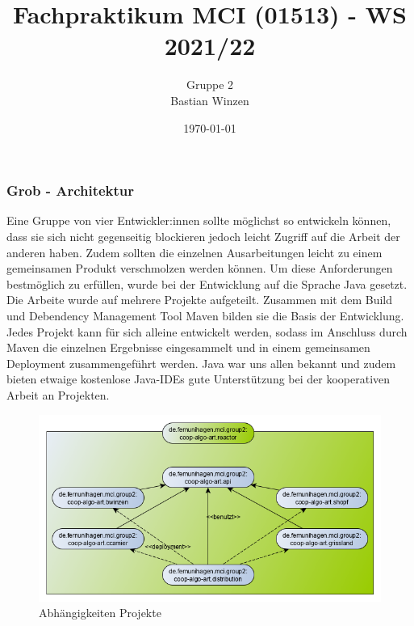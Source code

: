 \documentclass[../mciAusarbeitung.tex]{subfiles}
\title{Fachpraktikum MCI (01513) - WS 2021/22}
\author{Gruppe 2\\
	Bastian Winzen}
\date{\today}
\begin{document}
	\subsubsection{Grob - Architektur}
	Eine Gruppe von vier Entwickler:innen sollte möglichst so entwickeln können, dass sie sich nicht gegenseitig blockieren jedoch leicht Zugriff auf die Arbeit der anderen haben. Zudem sollten die einzelnen Ausarbeitungen leicht zu einem gemeinsamen Produkt verschmolzen werden können. Um diese Anforderungen bestmöglich zu erfüllen, wurde bei der Entwicklung auf die Sprache Java gesetzt. Die Arbeite wurde auf mehrere Projekte aufgeteilt. Zusammen mit dem Build und Debendency Management Tool Maven bilden sie die Basis der Entwicklung. Jedes Projekt kann für sich alleine entwickelt werden, sodass im Anschluss durch Maven die einzelnen Ergebnisse eingesammelt und in einem gemeinsamen Deployment zusammengeführt werden. Java war uns allen bekannt und zudem bieten etwaige kostenlose Java-IDEs gute Unterstützung bei der kooperativen Arbeit an Projekten.\\
	\begin{figure}[H]
	 \includegraphics[width=1\linewidth]{"img/projectsDependencyTree.png"}
	 	\caption[Abhängigkeiten Projekte]{Abhängigkeiten Projekte}
	 \end{figure}
	 
\end{document}
